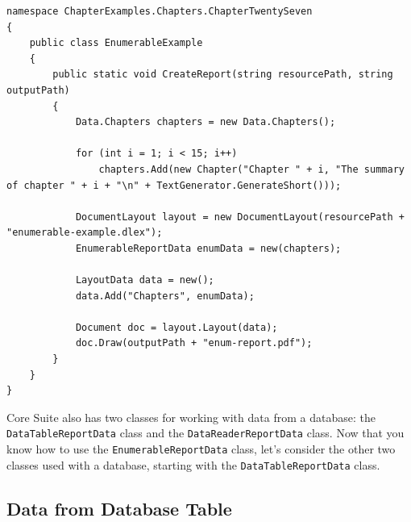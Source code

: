 \documentclass[american,letterpaper]{tufte-book}
\numberwithin{equation}{section}
\numberwithin{figure}{section}
\begin{document}
{{\begin{lstlisting}[caption={Providing enumerable report data.},label={lis:Providing-enumerable-report},basicstyle={\small\ttfamily},breaklines=true]
namespace ChapterExamples.Chapters.ChapterTwentySeven
{
    public class EnumerableExample
    {
        public static void CreateReport(string resourcePath, string outputPath)
        {
            Data.Chapters chapters = new Data.Chapters();

            for (int i = 1; i < 15; i++)
                chapters.Add(new Chapter("Chapter " + i, "The summary of chapter " + i + "\n" + TextGenerator.GenerateShort()));

            DocumentLayout layout = new DocumentLayout(resourcePath + "enumerable-example.dlex");
            EnumerableReportData enumData = new(chapters);
             
            LayoutData data = new();
            data.Add("Chapters", enumData);

            Document doc = layout.Layout(data);
            doc.Draw(outputPath + "enum-report.pdf");
        }
    }
}
\end{lstlisting}
\leavevmode\egroup

Core Suite also has two classes for working with data from a database:
the \texttt{DataTableReportData} class and the \texttt{DataReaderReportData}
class. Now that you know how to use the \texttt{EnumerableReportData}
class, let's consider the other two classes used with a database,
starting with the \texttt{DataTableReportData} class.

\subsection{Data from Database Table}

}}
\end{document}
